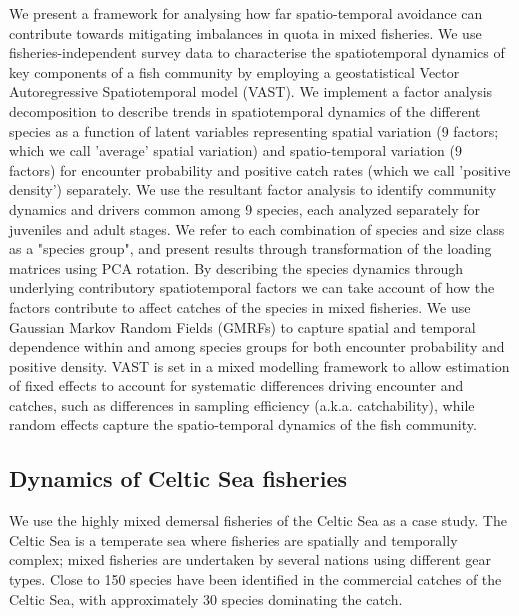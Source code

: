 \documentclass{nature}
\begin{document}
\begin{linenumbers}
We present a framework for analysing how far spatio-temporal avoidance can
contribute towards mitigating imbalances in quota in mixed fisheries. We use
fisheries-independent survey data to characterise the spatiotemporal dynamics
of key components of a fish community by employing a geostatistical Vector
Autoregressive Spatiotemporal model (VAST). We implement a factor analysis
decomposition to describe trends in spatiotemporal dynamics of the different
species as a function of latent variables\cite{Thorson2015} representing
spatial variation (9 factors; which we call 'average' spatial variation) and
spatio-temporal variation (9 factors) for encounter probability and positive
catch rates (which we call 'positive density') separately\cite{Thorson2015a}.
We use the resultant factor analysis to identify community dynamics and drivers
common among 9 species, each analyzed separately for juveniles and adult
stages.  We refer to each combination of species and size class as a "species
group", and present results through transformation of the loading matrices
using PCA rotation. By describing the species dynamics through
underlying contributory spatiotemporal factors we can take account of how the
factors contribute to affect catches of the species in mixed fisheries.
We use Gaussian Markov Random Fields (GMRFs) to capture spatial and temporal
dependence within and among species groups for both encounter probability and
positive density\cite{Thorson2013}. VAST is set in a mixed modelling framework
to allow estimation of fixed effects to account for systematic differences
driving encounter and catches, such as differences in sampling efficiency
(a.k.a.  catchability), while random effects capture the spatio-temporal
dynamics of the fish community.

\subsection{Dynamics of Celtic Sea fisheries}

We use the highly mixed demersal fisheries of the Celtic Sea as a case study.
The Celtic Sea is a temperate sea where fisheries are spatially and temporally
complex; mixed fisheries are undertaken by several nations using different gear
types\cite{Ellis2000, Gerritsen2012}. Close to 150 species have been
identified in the commercial catches of the Celtic Sea, with approximately 30
species dominating the catch\cite{Mateo2016}.


\end{linenumbers}
\end{document}
